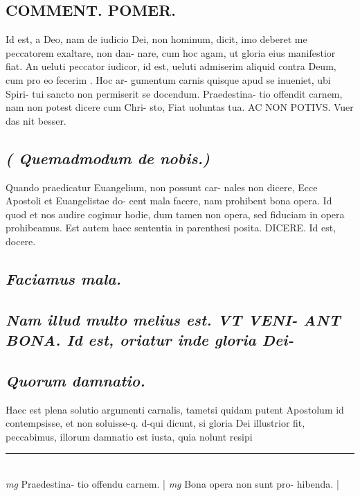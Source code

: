 \documentclass{article}
\begin{document}
\begin{pages}
\section*{COMMENT. POMER.  }\pstart Id est, a Deo, nam de iudicio Dei, non hominum, dicit, imo deberet me peccatorem exaltare, non dan- nare, cum hoc agam, ut gloria eius manifestior fiat.  An ueluti peccator iudicor, id est, ueluti admiserim aliquid contra Deum, cum pro eo fecerim . Hoc ar- gumentum carnis quisque apud se inueniet, ubi Spiri- tui sancto non permiserit se docendum. Praedestina- tio offendit carnem, nam non potest dicere cum Chri- sto, Fiat uoluntas tua. AC NON POTIVS.  Vuer das nit besser.   \pend
{}
{}
\subsection*{\textit{( Quemadmodum de nobis.) }}\pstart Quando praedicatur Euangelium, non possunt car- nales non dicere, Ecce Apostoli et Euangelistae do- cent mala facere, nam prohibent bona opera. Id quod et nos audire cogimur hodie, dum tamen non opera, sed fiduciam in opera prohibeamus. Est autem haec sententia in parenthesi posita. DICERE.  Id est, docere.   \pend
{}
{}
\subsection*{\textit{Faciamus mala. }}
{}
\subsection*{\textit{Nam illud multo melius est. VT VENI- ANT BONA. Id est, oriatur inde gloria Dei- }}
{}
\subsection*{\textit{Quorum damnatio. }}\pstart Haec est plena solutio argumenti carnalis, tametsi quidam putent Apostolum id contempsisse, et non soluisse-q. d-qui dicunt, si gloria Dei illustrior fit, peccabimus, illorum damnatio est iusta, quia nolunt resipi  \pend\pstart  \pend
\vspace{0.5cm}\noindent
\vspace{0.2cm}\rule{1cm}{0.2pt}\\ 
\hspace{0.2cm}\textit{mg}
\footnotesize Praedestina- tio offendu carnem.  
\normalsize| 
\hspace{0.2cm}\textit{mg}
\footnotesize Bona opera non sunt pro- hibenda.  
\normalsize| 

\end{pages}
\end{document}
